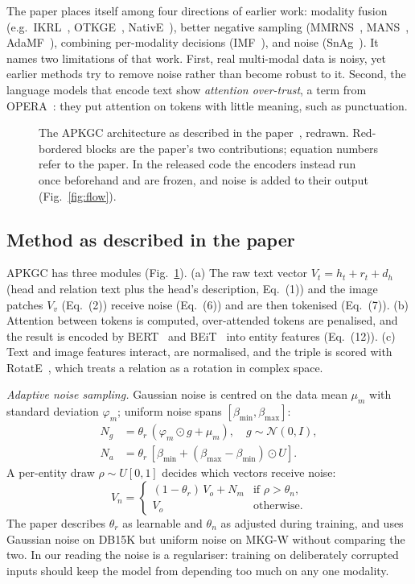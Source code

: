 \documentclass[conference,a4paper]{IEEEtran}
\begin{document}
The paper places itself among four directions of earlier work: modality fusion (e.g.\
IKRL~\cite{ikrl}, OTKGE~\cite{otkge}, NativE~\cite{native}), better negative sampling
(MMRNS~\cite{mkgw}, MANS~\cite{mans}, AdaMF~\cite{adamf}), combining per-modality decisions
(IMF~\cite{imf}), and noise (SnAg~\cite{snag}). It names two limitations of that work. First, real
multi-modal data is noisy, yet earlier methods try to remove noise rather than become
robust to it. Second, the language models that encode text show \emph{attention
over-trust}, a term from OPERA~\cite{opera}: they put attention on tokens with little
meaning, such as punctuation.

\begin{figure}[t]
\centering
\resizebox{\textwidth}{!}{}
\caption{The APKGC architecture as described in the paper~\cite{apkgc}, redrawn. Red-bordered blocks are the paper's two contributions; equation numbers refer to the paper. In the released code the encoders instead run once beforehand and are frozen, and noise is added to their output (Fig.~\ref{fig:flow}).}
\label{fig:arch}
\end{figure}

\subsection{Method as described in the paper}
APKGC has three modules (Fig.~\ref{fig:arch}). (a) The raw text vector
$V_t=h_t+r_t+d_h$ (head and relation text plus the head's description, Eq.~(1)) and the
image patches $V_v$ (Eq.~(2)) receive noise (Eq.~(6)) and are then tokenised (Eq.~(7)).
(b) Attention between tokens is computed, over-attended tokens are penalised, and the
result is encoded by BERT~\cite{bert} and BEiT~\cite{beit} into entity features (Eq.~(12)).
(c) Text and image features interact, are normalised, and the triple is scored with
RotatE~\cite{rotate}, which treats a relation as a rotation in complex space.

\emph{Adaptive noise sampling.} Gaussian noise is centred on the data mean $\mu_m$ with
standard deviation $\varphi_m$; uniform noise spans $[\beta_{\min},\beta_{\max}]$:
\begin{align}
N_g &= \theta_r\,(\varphi_m\odot g+\mu_m),\quad g\sim\mathcal{N}(0,I), \tag{3}\\
N_a &= \theta_r\,[\beta_{\min}+(\beta_{\max}-\beta_{\min})\odot U]. \tag{4}
\end{align}
A per-entity draw $\rho\sim U[0,1]$ decides which vectors receive noise:
\begin{equation}
V_n=\begin{cases}(1-\theta_r)\,V_o+N_m & \text{if } \rho>\theta_n,\\ V_o & \text{otherwise.}\end{cases} \tag{5}
\end{equation}
The paper describes $\theta_r$ as learnable and $\theta_n$ as adjusted during training,
and uses Gaussian noise on DB15K but uniform noise on MKG-W without comparing the two. In
our reading the noise is a regulariser: training on deliberately corrupted inputs should
keep the model from depending too much on any one modality.
\end{document}
